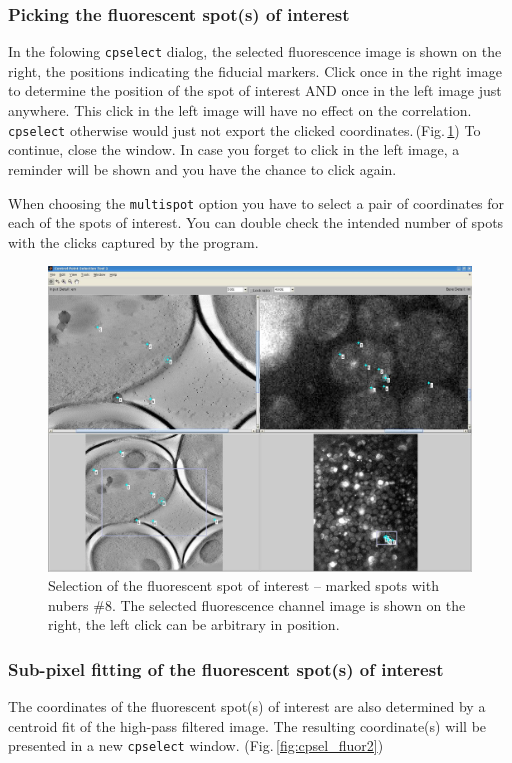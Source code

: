 \documentclass[10pt,a4paper,onepage,DIV12]{scrartcl}
\begin{document}
\subsubsection{Picking the fluorescent spot(s) of interest}
In the folowing \texttt{cpselect} dialog, the selected fluorescence image is shown on the right, the positions indicating the fiducial markers. Click once in the right image to determine the position of the spot of interest AND once in the left image just anywhere. This click in the left image will have no effect on the correlation. \texttt{cpselect} otherwise would just not export the clicked coordinates.\,(Fig.\,\ref{fig:cpsel_fluor1}) To continue, close the window. In case you forget to click in the left image, a reminder will be shown and you have the chance to click again. 

When choosing the \texttt{multispot} option you have to select a pair of coordinates for each of the spots of interest. You can double check the intended number of spots with the clicks captured by the program.
\begin{figure}
 \centering
 \includegraphics[width=.78\textwidth]{images/cpsel_fluor1.jpg}
 \caption{Selection of the fluorescent spot of interest -- marked spots with nubers \#8. The selected fluorescence channel image is shown on the right, the left click can be arbitrary in position.}
 \label{fig:cpsel_fluor1}
\end{figure}

\subsubsection{Sub-pixel fitting of the fluorescent spot(s) of interest}
The coordinates of the fluorescent spot(s) of interest are also determined by a centroid fit of the high-pass filtered image. The resulting coordinate(s) will be presented in a new \texttt{cpselect} window. (Fig.\,\ref{fig:cpsel_fluor2})\\
\end{document}
